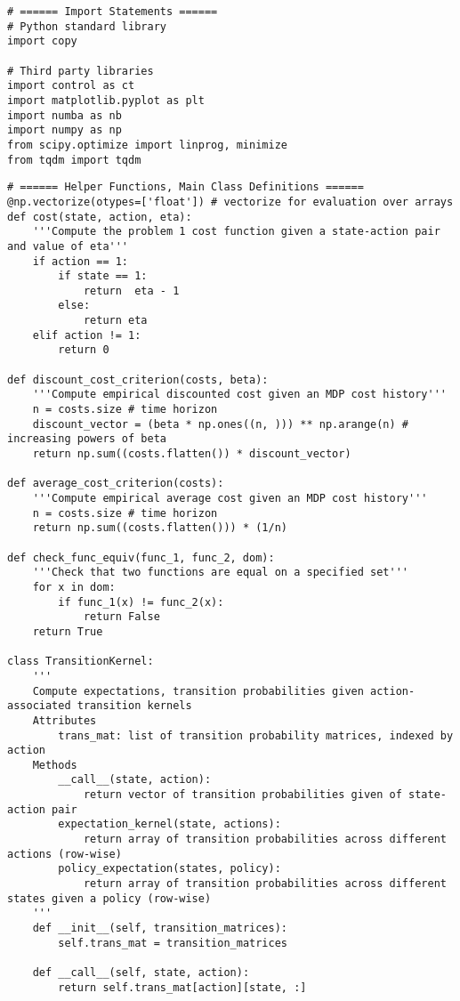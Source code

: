 \documentclass[10pt]{article}
\newcommand{\1}[1]{\mathbbm{1}_{#1}}
\begin{document}
    \begin{verbatim}
# ====== Import Statements ======
# Python standard library
import copy

# Third party libraries
import control as ct
import matplotlib.pyplot as plt
import numba as nb
import numpy as np
from scipy.optimize import linprog, minimize
from tqdm import tqdm
    \end{verbatim}
    \begin{verbatim}
# ====== Helper Functions, Main Class Definitions ======
@np.vectorize(otypes=['float']) # vectorize for evaluation over arrays
def cost(state, action, eta):
    '''Compute the problem 1 cost function given a state-action pair and value of eta'''
    if action == 1:
        if state == 1:
            return  eta - 1 
        else:
            return eta 
    elif action != 1:
        return 0

def discount_cost_criterion(costs, beta):
    '''Compute empirical discounted cost given an MDP cost history'''
    n = costs.size # time horizon
    discount_vector = (beta * np.ones((n, ))) ** np.arange(n) # increasing powers of beta
    return np.sum((costs.flatten()) * discount_vector) 

def average_cost_criterion(costs):
    '''Compute empirical average cost given an MDP cost history'''
    n = costs.size # time horizon
    return np.sum((costs.flatten())) * (1/n)

def check_func_equiv(func_1, func_2, dom):
    '''Check that two functions are equal on a specified set'''
    for x in dom:
        if func_1(x) != func_2(x):
            return False
    return True

class TransitionKernel:
    '''
    Compute expectations, transition probabilities given action-associated transition kernels
    Attributes
        trans_mat: list of transition probability matrices, indexed by action
    Methods
        __call__(state, action):
            return vector of transition probabilities given of state-action pair
        expectation_kernel(state, actions):
            return array of transition probabilities across different actions (row-wise)
        policy_expectation(states, policy):
            return array of transition probabilities across different states given a policy (row-wise)
    '''
    def __init__(self, transition_matrices):
        self.trans_mat = transition_matrices
    
    def __call__(self, state, action):
        return self.trans_mat[action][state, :]
    

\end{verbatim}
\end{document}
